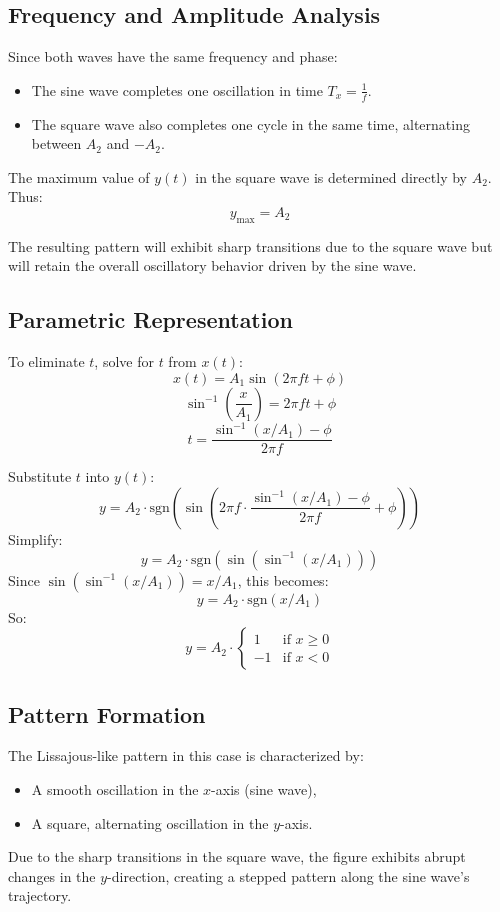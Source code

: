 \documentclass[12pt,a4paper]{report}
\begin{document}
\subsection*{Frequency and Amplitude Analysis}
Since both waves have the same frequency and phase:
\begin{itemize}
    \item The sine wave completes one oscillation in time $T_x = \frac{1}{f}$.
    \item The square wave also completes one cycle in the same time, alternating between \( A_2 \) and \( -A_2 \).
\end{itemize}

The maximum value of \( y(t) \) in the square wave is determined directly by \( A_2 \). Thus:
\[
y_{\text{max}} = A_2
\]

The resulting pattern will exhibit sharp transitions due to the square wave but will retain the overall oscillatory behavior driven by the sine wave.

\subsection*{Parametric Representation}
To eliminate \( t \), solve for \( t \) from \( x(t) \):
\[
x(t) = A_1 \sin(2 \pi f t + \phi)
\]
\[
\sin^{-1}\left(\frac{x}{A_1}\right) = 2 \pi f t + \phi
\]
\[
t = \frac{\sin^{-1}(x / A_1) - \phi}{2 \pi f}
\]

Substitute \( t \) into \( y(t) \):
\[
y = A_2 \cdot \text{sgn}\left( \sin\left(2 \pi f \cdot \frac{\sin^{-1}(x / A_1) - \phi}{2 \pi f} + \phi \right) \right)
\]
Simplify:
\[
y = A_2 \cdot \text{sgn}\left( \sin\left( \sin^{-1}(x / A_1) \right) \right)
\]
Since \( \sin(\sin^{-1}(x / A_1)) = x / A_1 \), this becomes:
\[
y = A_2 \cdot \text{sgn}\left( x / A_1 \right)
\]
So:
\[
y = A_2 \cdot \begin{cases} 
1 & \text{if } x \geq 0 \\
-1 & \text{if } x < 0
\end{cases}
\]

\subsection*{Pattern Formation}
The Lissajous-like pattern in this case is characterized by:
\begin{itemize}
    \item A smooth oscillation in the \( x \)-axis (sine wave),
    \item A square, alternating oscillation in the \( y \)-axis.
\end{itemize}
Due to the sharp transitions in the square wave, the figure exhibits abrupt changes in the \( y \)-direction, creating a stepped pattern along the sine wave's trajectory.
\end{document}
